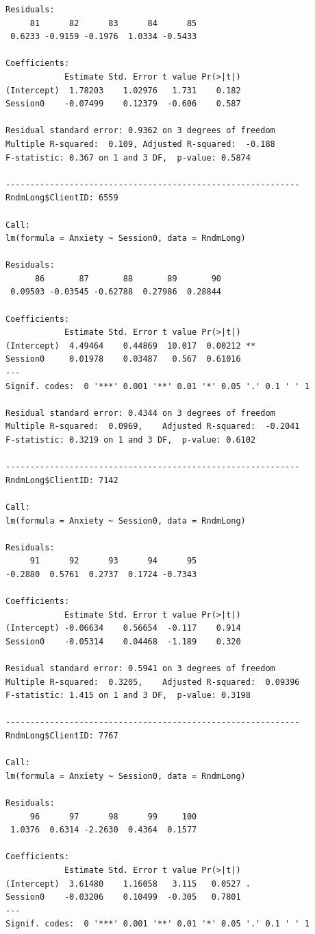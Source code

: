 \documentclass[
  11pt,
]{book}
\begin{document}
\begin{verbatim}
Residuals:
     81      82      83      84      85 
 0.6233 -0.9159 -0.1976  1.0334 -0.5433 

Coefficients:
            Estimate Std. Error t value Pr(>|t|)
(Intercept)  1.78203    1.02976   1.731    0.182
Session0    -0.07499    0.12379  -0.606    0.587

Residual standard error: 0.9362 on 3 degrees of freedom
Multiple R-squared:  0.109, Adjusted R-squared:  -0.188 
F-statistic: 0.367 on 1 and 3 DF,  p-value: 0.5874

------------------------------------------------------------ 
RndmLong$ClientID: 6559

Call:
lm(formula = Anxiety ~ Session0, data = RndmLong)

Residuals:
      86       87       88       89       90 
 0.09503 -0.03545 -0.62788  0.27986  0.28844 

Coefficients:
            Estimate Std. Error t value Pr(>|t|)   
(Intercept)  4.49464    0.44869  10.017  0.00212 **
Session0     0.01978    0.03487   0.567  0.61016   
---
Signif. codes:  0 '***' 0.001 '**' 0.01 '*' 0.05 '.' 0.1 ' ' 1

Residual standard error: 0.4344 on 3 degrees of freedom
Multiple R-squared:  0.0969,    Adjusted R-squared:  -0.2041 
F-statistic: 0.3219 on 1 and 3 DF,  p-value: 0.6102

------------------------------------------------------------ 
RndmLong$ClientID: 7142

Call:
lm(formula = Anxiety ~ Session0, data = RndmLong)

Residuals:
     91      92      93      94      95 
-0.2880  0.5761  0.2737  0.1724 -0.7343 

Coefficients:
            Estimate Std. Error t value Pr(>|t|)
(Intercept) -0.06634    0.56654  -0.117    0.914
Session0    -0.05314    0.04468  -1.189    0.320

Residual standard error: 0.5941 on 3 degrees of freedom
Multiple R-squared:  0.3205,    Adjusted R-squared:  0.09396 
F-statistic: 1.415 on 1 and 3 DF,  p-value: 0.3198

------------------------------------------------------------ 
RndmLong$ClientID: 7767

Call:
lm(formula = Anxiety ~ Session0, data = RndmLong)

Residuals:
     96      97      98      99     100 
 1.0376  0.6314 -2.2630  0.4364  0.1577 

Coefficients:
            Estimate Std. Error t value Pr(>|t|)  
(Intercept)  3.61480    1.16058   3.115   0.0527 .
Session0    -0.03206    0.10499  -0.305   0.7801  
---
Signif. codes:  0 '***' 0.001 '**' 0.01 '*' 0.05 '.' 0.1 ' ' 1


\end{verbatim}
\end{document}

